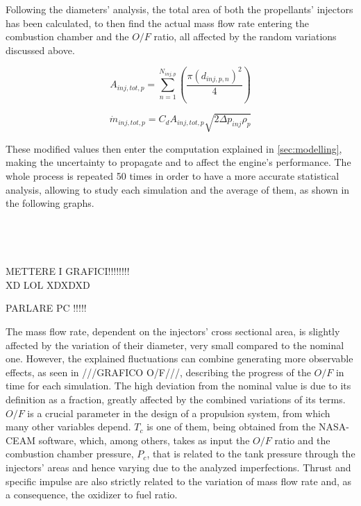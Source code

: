 Following the diameters' analysis, the total area of both the propellants' injectors has been calculated, to then find the actual mass flow rate entering the combustion chamber and the $O/F$ ratio, all affected by the random variations discussed above. 


\begin{equation}
	A_{inj,tot,p} = \sum_{n=1}^{N_{inj,p}} \left(\frac{\pi(d_{inj,p,n})^2}{4} \right)
    \label{eq:totalarea}
\end{equation}

\begin{equation}
    \dot m_{inj,tot,p} = C_{d}A_{inj,tot,p}\sqrt{2\Delta p_{inj}\rho_p}
    \label{eq:massflow}
\end{equation}

These modified values then enter the computation explained in \autoref{sec:modelling}, making the uncertainty to propagate and to affect the engine's performance. The whole process is repeated 50 times in order to have a more accurate statistical analysis, allowing to study each simulation and the average of them, as shown in the following graphs.
\\
\\
\\
\\
\\


METTERE I GRAFICI!!!!!!!!\\ XD LOL XDXDXD 


PARLARE PC !!!!!

The mass flow rate, dependent on the injectors' cross sectional area, is slightly affected by the variation of their diameter, very small compared to the nominal one. However, the explained fluctuations can combine generating more observable effects, as seen in ///GRAFICO O/F///, describing the progress of the $O/F$ in time for each simulation. The high deviation from the nominal value is due to its definition as a fraction, greatly affected by the combined variations of its terms. $O/F$ is a crucial parameter in the design of a propulsion system, from which many other variables depend. $T_c$ is one of them, being obtained from the NASA-CEAM software, which, among others, takes as input the $O/F$ ratio and the combustion chamber pressure, $P_c$, that is related to the tank pressure through the injectors' areas and hence varying due to the analyzed imperfections. Thrust and specific impulse are also strictly related to the variation of mass flow rate and, as a consequence, the oxidizer to fuel ratio.

